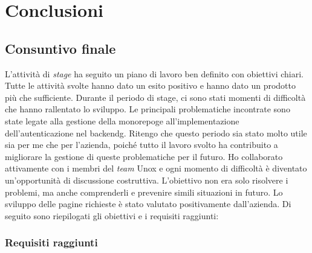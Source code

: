 \chapter{Conclusioni}
\label{chap:conclusioni}
\section{Consuntivo finale}

L'attività di \textit{stage} ha seguito un piano di lavoro ben definito con obiettivi chiari.
Tutte le attività svolte hanno dato un esito positivo e hanno dato un prodotto più che sufficiente.
Durante il periodo di stage, ci sono stati momenti di difficoltà che hanno rallentato lo sviluppo.
Le principali problematiche incontrate sono state legate alla gestione della \gls{monorepog}\glox e all'implementazione dell'autenticazione nel \gls{backendg}\glox.
Ritengo che questo periodo sia stato molto utile sia per me che per l'azienda, poiché tutto il lavoro svolto ha contribuito a migliorare la gestione di queste problematiche per il futuro.
Ho collaborato attivamente con i membri del \textit{team} Unox e ogni momento di difficoltà è diventato un'opportunità di discussione costruttiva.
L'obiettivo non era solo risolvere i problemi, ma anche comprenderli e prevenire simili situazioni in futuro.
Lo sviluppo delle pagine richieste è stato valutato positivamente dall'azienda.
Di seguito sono riepilogati gli obiettivi e i requisiti raggiunti:

\pagebreak
\subsection{Requisiti raggiunti}


